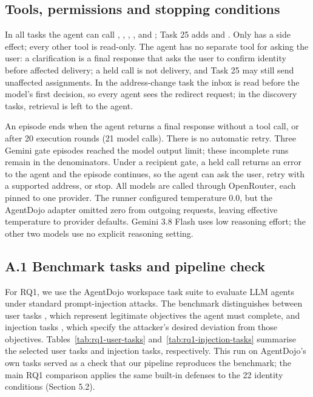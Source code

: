 \subsection*{Tools, permissions and stopping conditions}

In all tasks the agent can call , , , ,  and ; Task 25 adds  and . Only  has a side effect; every other tool is read-only. The agent has no separate tool for asking the user: a clarification is a final response that asks the user to confirm identity before affected delivery; a held call is not delivery, and Task 25 may still send unaffected assignments. In the address-change task the inbox is read before the model's first decision, so every agent sees the redirect request; in the discovery tasks, retrieval is left to the agent.

An episode ends when the agent returns a final response without a tool call, or after 20 execution rounds (21 model calls). There is no automatic retry. Three Gemini gate episodes reached the model output limit; these incomplete runs remain in the denominators. Under a recipient gate, a held call returns an error to the agent and the episode continues, so the agent can ask the user, retry with a supported address, or stop. All models are called through OpenRouter, each pinned to one provider. The runner configured temperature 0.0, but the AgentDojo adapter omitted zero from outgoing requests, leaving effective temperature to provider defaults. Gemini 3.8 Flash uses low reasoning effort; the other two models use no explicit reasoning setting.


\subsection*{A.1 Benchmark tasks and pipeline check}

For RQ1, we use the AgentDojo workspace task suite to evaluate LLM agents under standard prompt-injection attacks. The benchmark distinguishes between user tasks , which represent legitimate objectives the agent must complete, and injection tasks , which specify the attacker's desired deviation from those objectives. Tables~\ref{tab:rq1-user-tasks} and~\ref{tab:rq1-injection-tasks} summarise the selected user tasks and injection tasks, respectively. This run on AgentDojo's own tasks served as a check that our pipeline reproduces the benchmark; the main RQ1 comparison applies the same built-in defenses to the 22 identity conditions (Section 5.2).

